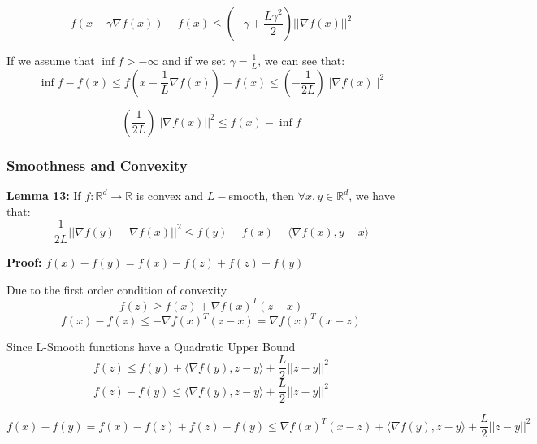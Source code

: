 \begin{equation}
    f(x - \gamma \nabla f(x)) - f(x) \leq (- \gamma + \frac{L\gamma ^2}{2}) ||\nabla f(x)||^2
\end{equation}

\noindent If we assume that $\inf f > -\infty$ and if we set $\gamma = \frac{1}{L}$, we can see that:
\begin{equation}
    \inf f - f(x) \leq f(x - \frac{1}{L} \nabla f(x)) - f(x) \leq (-\frac{1}{2L}) ||\nabla f(x)||^2
\end{equation}

\begin{equation}
    (\frac{1}{2L}) ||\nabla f(x)||^2 \leq f(x) - \inf f
\end{equation}


\subsubsection{Smoothness and Convexity}
\noindent \textbf{Lemma 13:} If $f: \mathbb{R}^d \rightarrow \mathbb{R}$ is convex and $L-$smooth, then $\forall x, y \in \mathbb{R}^d$, we have that: 
\begin{equation}
    \frac{1}{2L} ||\nabla f(y) - \nabla f(x)||^2 \leq f(y) - f(x) - \langle \nabla f(x), y - x \rangle
\end{equation}

\noindent \textbf{Proof:} 
$f(x) - f(y) = f(x) - f(z) + f(z) - f(y)$ \newline 

\noindent Due to the first order condition of convexity 
\begin{equation}
    f(z) \geq f(x) + \nabla f(x)^T (z - x)
\end{equation}
\begin{equation}
    f(x) - f(z) \leq -\nabla f(x)^T (z - x) = \nabla f(x)^T(x - z)
\end{equation}

\noindent Since L-Smooth functions have a Quadratic Upper Bound
\begin{equation}
    f(z) \leq f(y) + \langle \nabla f(y), z - y \rangle + \frac{L}{2} ||z - y||^2
\end{equation}
\begin{equation}
    f(z) - f(y) \leq \langle \nabla f(y), z - y \rangle + \frac{L}{2} ||z - y||^2
\end{equation}

\begin{equation}
    f(x) - f(y) = f(x) - f(z) + f(z) - f(y) \leq \nabla f(x)^T(x - z) + \langle \nabla f(y), z - y \rangle + \frac{L}{2} ||z - y||^2
\end{equation}

